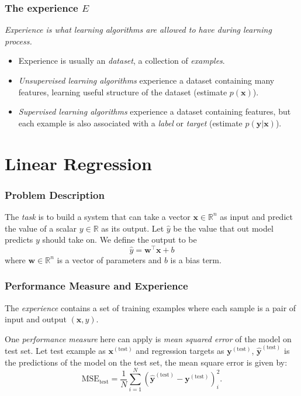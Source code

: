 \documentclass{beamer}
\begin{document}
\begin{frame}
  \frametitle{The experience $E$}

  \emph{Experience is what learning algorithms are allowed to have during learning process.}

  \begin{itemize}
    \item[\ding{229}] Experience is usually an \emph{dataset}, a collection of \emph{examples}.
    \item[\ding{229}] \emph{Unsupervised learning algorithms} experience a dataset containing many features, learning useful structure of the dataset (estimate $p(\mathbf{x})$).
    \item[\ding{229}] \emph{Supervised learning algorithms} experience a dataset containing features, but each example is also associated with a \emph{label} or \emph{target} (estimate $p(\mathbf{y}|\mathbf{x})$).
  \end{itemize}
  
\end{frame}

\section{Linear Regression}

\begin{frame}
  \frametitle{Problem Description}

  The \emph{task} is to build a system that can take a vector $\mathbf{x}\in\mathbb{R}^{n}$ as input and predict the value of a scalar $y\in\mathbb{R}$ as its output. Let $\hat{y}$ be the value that out model predicts $y$ should take on. We define the output to be
  \begin{equation*}
    \hat{y}=\mathbf{w}^{\top}\mathbf{x}+b
  \end{equation*}
  where $\mathbf{w}\in\mathbb{R}^{n}$ is a vector of parameters and $b$ is a bias term.
\end{frame}

\begin{frame}
  \frametitle{Performance Measure and Experience}

  The \emph{experience} contains a set of training examples where each sample is a pair of input and output $(\mathbf{x}, y)$.

  One \emph{performance measure} here can apply is \emph{mean squared error} of the model on test set. Let test example as $\mathbf{x}^{(\text{test})}$ and regression targets as $\mathbf{y}^{(\text{test})}$, $\hat{\mathbf{y}}^{(\text{test})}$ is the predictions of the model on the test set, the mean square error is given by:
  \begin{equation*}
      \text{MSE}_{\text{test}}=\frac{1}{N}\sum_{i=1}^{N}(\hat{\mathbf{y}}^{(\text{test})}-\mathbf{y}^{(\text{test})})_{i}^{2}.
  \end{equation*}
\end{frame}
\end{document}
